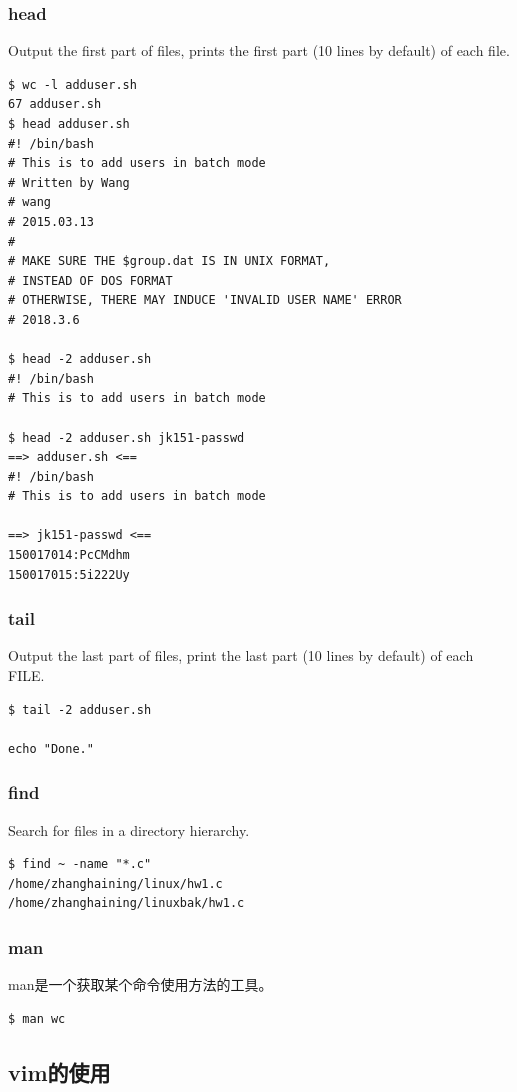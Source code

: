 \subsubsection{head}
Output the first part of files, prints the first part (10 lines by default) of each file.
\begin{verbatim}
$ wc -l adduser.sh
67 adduser.sh
$ head adduser.sh
#! /bin/bash
# This is to add users in batch mode
# Written by Wang
# wang
# 2015.03.13
#
# MAKE SURE THE $group.dat IS IN UNIX FORMAT,
# INSTEAD OF DOS FORMAT
# OTHERWISE, THERE MAY INDUCE 'INVALID USER NAME' ERROR
# 2018.3.6

$ head -2 adduser.sh
#! /bin/bash
# This is to add users in batch mode

$ head -2 adduser.sh jk151-passwd
==> adduser.sh <==
#! /bin/bash
# This is to add users in batch mode

==> jk151-passwd <==
150017014:PcCMdhm
150017015:5i222Uy

\end{verbatim}

\subsubsection{tail}
Output the last part of files, print the last part (10 lines by default) of each FILE.
\begin{verbatim}
$ tail -2 adduser.sh

echo "Done."
\end{verbatim}

\subsubsection{find}
Search for files in a directory hierarchy.
\begin{verbatim}
$ find ~ -name "*.c"
/home/zhanghaining/linux/hw1.c
/home/zhanghaining/linuxbak/hw1.c
\end{verbatim}

\subsubsection{man}
man是一个获取某个命令使用方法的工具。
\begin{verbatim}
$ man wc
\end{verbatim}
\subsection{vim的使用}
